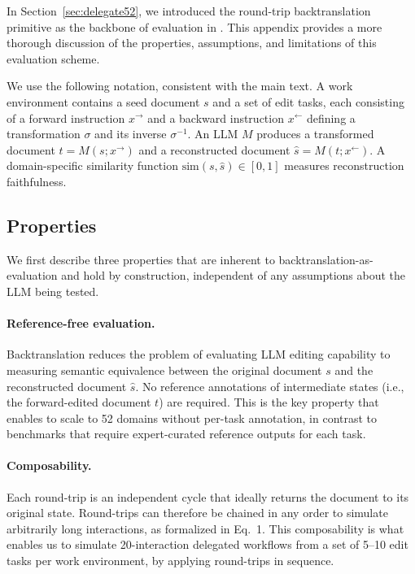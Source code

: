 \documentclass{article} %
\begin{document}
In Section~\ref{sec:delegate52}, we introduced the round-trip backtranslation primitive as the backbone of evaluation in \benchmark{}. This appendix provides a more thorough discussion of the properties, assumptions, and limitations of this evaluation scheme.

We use the following notation, consistent with the main text. A work environment contains a seed document $s$ and a set of edit tasks, each consisting of a forward instruction $x^{\rightarrow}$ and a backward instruction $x^{\leftarrow}$ defining a transformation $\sigma$ and its inverse $\sigma^{-1}$. An LLM $M$ produces a transformed document $t = M(s; x^{\rightarrow})$ and a reconstructed document $\hat{s} = M(t; x^{\leftarrow})$. A domain-specific similarity function $\mathrm{sim}(s, \hat{s}) \in [0, 1]$ measures reconstruction faithfulness.

\subsection{Properties} \label{app:bt_properties}

We first describe three properties that are inherent to backtranslation-as-evaluation and hold by construction, independent of any assumptions about the LLM being tested.

\paragraph{Reference-free evaluation.} Backtranslation reduces the problem of evaluating LLM editing capability to measuring semantic equivalence between the original document $s$ and the reconstructed document $\hat{s}$. No reference annotations of intermediate states (i.e., the forward-edited document $t$) are required. This is the key property that enables \benchmark{} to scale to 52 domains without per-task annotation, in contrast to benchmarks that require expert-curated reference outputs for each task.

\paragraph{Composability.} Each round-trip is an independent cycle that ideally returns the document to its original state. Round-trips can therefore be chained in any order to simulate arbitrarily long interactions, as formalized in Eq.~1. This composability is what enables us to simulate 20-interaction delegated workflows from a set of 5--10 edit tasks per work environment, by applying round-trips in sequence.
\end{document}
